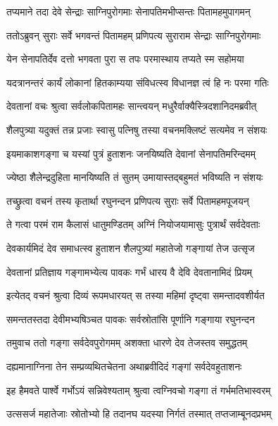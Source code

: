 
\twolineshloka
{तप्यमाने तदा देवे सेन्द्राः साग्निपुरोगमाः}
{सेनापतिमभीप्सन्तः पितामहमुपागमन्} %

\twolineshloka
{ततोऽब्रुवन् सुराः सर्वे भगवन्तं पितामहम्}
{प्रणिपत्य सुराराम सेन्द्राः साग्निपुरोगमाः} %

\twolineshloka
{येन सेनापतिर्देव दत्तो भगवता पुरा}
{स तपः परमास्थाय तप्यते स्म सहोमया} %

\twolineshloka
{यदत्रानन्तरं कार्यं लोकानां हितकाम्यया}
{संविधत्स्व विधानज्ञ त्वं हि नः परमा गतिः} %

\twolineshloka
{देवतानां वचः श्रुत्वा सर्वलोकपितामहः}
{सान्त्वयन् मधुरैर्वाक्यैस्त्रिदशानिदमब्रवीत्} %

\twolineshloka
{शैलपुत्र्या यदुक्तं तन्न प्रजाः स्वासु पत्निषु}
{तस्या वचनमक्लिष्टं सत्यमेव न संशयः} %

\twolineshloka
{इयमाकाशगङ्गा च यस्यां पुत्रं हुताशनः}
{जनयिष्यति देवानां सेनापतिमरिन्दमम्} %

\twolineshloka
{ज्येष्ठा शैलेन्द्रदुहिता मानयिष्यति तं सुतम्}
{उमायास्तद्बहुमतं भविष्यति न संशयः} %

\twolineshloka
{तच्छ्रुत्वा वचनं तस्य कृतार्था रघुनन्दन}
{प्रणिपत्य सुराः सर्वे पितामहमपूजयन्} %

\twolineshloka
{ते गत्वा परमं राम कैलासं धातुमण्डितम्}
{अग्निं नियोजयामासुः पुत्रार्थं सर्वदेवताः} %

\twolineshloka
{देवकार्यमिदं देव समाधत्स्व हुताशन}
{शैलपुत्र्यां महातेजो गङ्गायां तेज उत्सृज} %

\twolineshloka
{देवतानां प्रतिज्ञाय गङ्गामभ्येत्य पावकः}
{गर्भं धारय वै देवि देवतानामिदं प्रियम्} %

\twolineshloka
{इत्येतद् वचनं श्रुत्वा दिव्यं रूपमधारयत्}
{स तस्या महिमां दृष्ट्वा समन्तादवशीर्यत} %

\twolineshloka
{समन्ततस्तदा देवीमभ्यषिञ्चत पावकः}
{सर्वस्रोतांसि पूर्णानि गङ्गाया रघुनन्दन} %

\twolineshloka
{तमुवाच ततो गङ्गा सर्वदेवपुरोगमम्}
{अशक्ता धारणे देव तेजस्तव समुद्धतम्} %

\twolineshloka
{दह्यमानाग्निना तेन सम्प्रव्यथितचेतना}
{अथाब्रवीदिदं गङ्गां सर्वदेवहुताशनः} %

\twolineshloka
{इह हैमवते पार्श्वे गर्भोऽयं सन्निवेश्यताम्}
{श्रुत्वा त्वग्निवचो गङ्गा तं गर्भमतिभास्वरम्} %

\twolineshloka
{उत्ससर्ज महातेजाः स्रोतोभ्यो हि तदानघ}
{यदस्या निर्गतं तस्मात् तप्तजाम्बूनदप्रभम्} %

